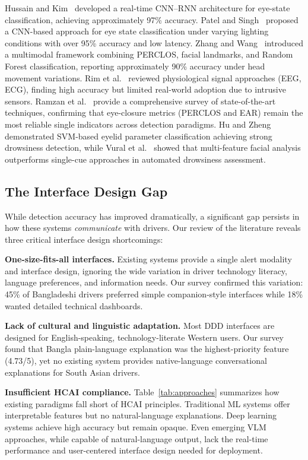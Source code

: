 \documentclass[sigconf]{acmart}
\begin{document}
Hussain and Kim~\cite{ref1} developed a real-time CNN--RNN architecture for eye-state classification, achieving approximately 97\% accuracy. Patel and Singh~\cite{ref2} proposed a CNN-based approach for eye state classification under varying lighting conditions with over 95\% accuracy and low latency. Zhang and Wang~\cite{ref3} introduced a multimodal framework combining PERCLOS, facial landmarks, and Random Forest classification, reporting approximately 90\% accuracy under head movement variations. Rim et al.~\cite{ref8} reviewed physiological signal approaches (EEG, ECG), finding high accuracy but limited real-world adoption due to intrusive sensors. Ramzan et al.~\cite{ref25} provide a comprehensive survey of state-of-the-art techniques, confirming that eye-closure metrics (PERCLOS and EAR) remain the most reliable single indicators across detection paradigms. Hu and Zheng~\cite{ref21} demonstrated SVM-based eyelid parameter classification achieving strong drowsiness detection, while Vural et al.~\cite{ref22} showed that multi-feature facial analysis outperforms single-cue approaches in automated drowsiness assessment.

\subsection{The Interface Design Gap}

While detection accuracy has improved dramatically, a significant gap persists in how these systems \textit{communicate} with drivers. Our review of the literature reveals three critical interface design shortcomings:

\textbf{One-size-fits-all interfaces.} Existing systems provide a single alert modality and interface design, ignoring the wide variation in driver technology literacy, language preferences, and information needs. Our survey confirmed this variation: 45\% of Bangladeshi drivers preferred simple companion-style interfaces while 18\% wanted detailed technical dashboards.

\textbf{Lack of cultural and linguistic adaptation.} Most DDD interfaces are designed for English-speaking, technology-literate Western users. Our survey found that Bangla plain-language explanation was the highest-priority feature (4.73/5), yet no existing system provides native-language conversational explanations for South Asian drivers.

\textbf{Insufficient HCAI compliance.} Table~\ref{tab:approaches} summarizes how existing paradigms fall short of HCAI principles. Traditional ML systems offer interpretable features but no natural-language explanations. Deep learning systems achieve high accuracy but remain opaque. Even emerging VLM approaches, while capable of natural-language output, lack the real-time performance and user-centered interface design needed for deployment.
\end{document}
